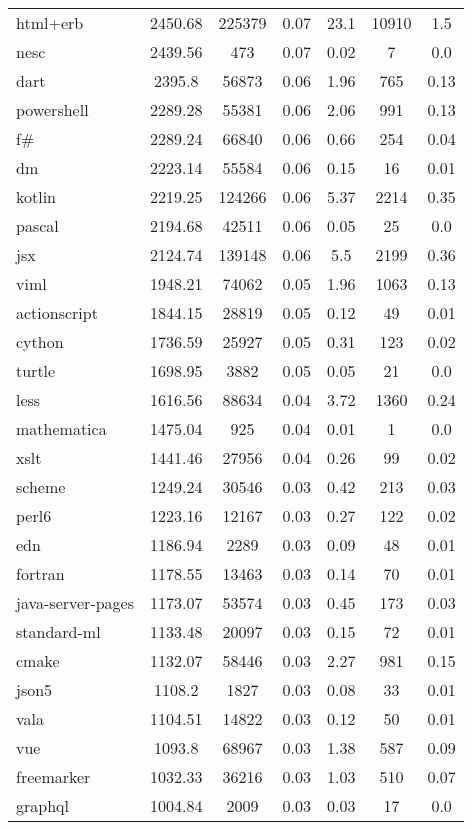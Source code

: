 \begin{longtable}{l|ccc|ccc}
html+erb & 2450.68 & 225379 & 0.07 & 23.1 & 10910 & 1.5 \\
nesc & 2439.56 & 473 & 0.07 & 0.02 & 7 & 0.0 \\
dart & 2395.8 & 56873 & 0.06 & 1.96 & 765 & 0.13 \\
powershell & 2289.28 & 55381 & 0.06 & 2.06 & 991 & 0.13 \\
f\# & 2289.24 & 66840 & 0.06 & 0.66 & 254 & 0.04 \\
dm & 2223.14 & 55584 & 0.06 & 0.15 & 16 & 0.01 \\
kotlin & 2219.25 & 124266 & 0.06 & 5.37 & 2214 & 0.35 \\
pascal & 2194.68 & 42511 & 0.06 & 0.05 & 25 & 0.0 \\
jsx & 2124.74 & 139148 & 0.06 & 5.5 & 2199 & 0.36 \\
viml & 1948.21 & 74062 & 0.05 & 1.96 & 1063 & 0.13 \\
actionscript & 1844.15 & 28819 & 0.05 & 0.12 & 49 & 0.01 \\
cython & 1736.59 & 25927 & 0.05 & 0.31 & 123 & 0.02 \\
turtle & 1698.95 & 3882 & 0.05 & 0.05 & 21 & 0.0 \\
less & 1616.56 & 88634 & 0.04 & 3.72 & 1360 & 0.24 \\
mathematica & 1475.04 & 925 & 0.04 & 0.01 & 1 & 0.0 \\
xslt & 1441.46 & 27956 & 0.04 & 0.26 & 99 & 0.02 \\
scheme & 1249.24 & 30546 & 0.03 & 0.42 & 213 & 0.03 \\
perl6 & 1223.16 & 12167 & 0.03 & 0.27 & 122 & 0.02 \\
edn & 1186.94 & 2289 & 0.03 & 0.09 & 48 & 0.01 \\
fortran & 1178.55 & 13463 & 0.03 & 0.14 & 70 & 0.01 \\
java-server-pages & 1173.07 & 53574 & 0.03 & 0.45 & 173 & 0.03 \\
standard-ml & 1133.48 & 20097 & 0.03 & 0.15 & 72 & 0.01 \\
cmake & 1132.07 & 58446 & 0.03 & 2.27 & 981 & 0.15 \\
json5 & 1108.2 & 1827 & 0.03 & 0.08 & 33 & 0.01 \\
vala & 1104.51 & 14822 & 0.03 & 0.12 & 50 & 0.01 \\
vue & 1093.8 & 68967 & 0.03 & 1.38 & 587 & 0.09 \\
freemarker & 1032.33 & 36216 & 0.03 & 1.03 & 510 & 0.07 \\
graphql & 1004.84 & 2009 & 0.03 & 0.03 & 17 & 0.0 \\

\end{longtable}

